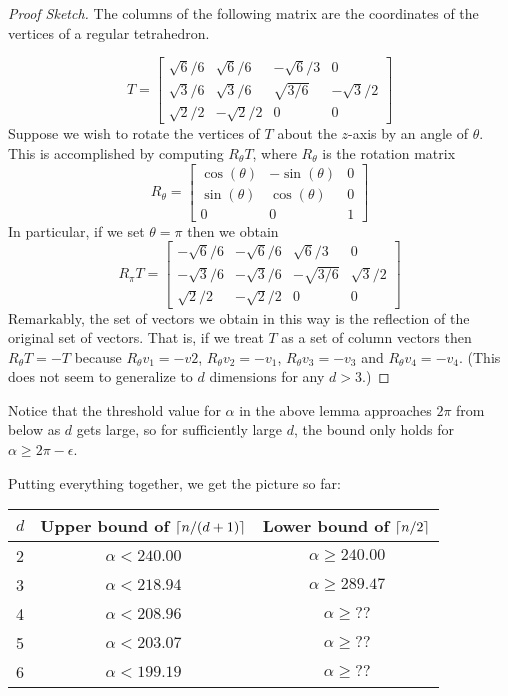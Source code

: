 \documentclass[lotsofwhite]{patmorin}
\begin{document}
\begin{proof}[Proof Sketch]
The columns of the following matrix are the coordinates of the
vertices of a regular tetrahedron.

\[T=\left[\begin{array}{cccccc}
  \sqrt{6}/6 & \sqrt{6}/6 & -\sqrt{6}/3 & 0 \\
  \sqrt{3}/6 & \sqrt{3}/6 & \sqrt{3/6} & -\sqrt{3}/2 \\
  \sqrt{2}/2 & -\sqrt{2}/2 & 0 & 0
\end{array} \right]
\]
Suppose we wish to 
rotate
the vertices of $T$ about the $z$-axis by an angle of $\theta$.
This is accomplished by computing 
$R_\theta T$, where $R_\theta$ is the rotation
matrix
\[R_\theta=\left[\begin{array}{ccccc}
   \cos(\theta)  & -\sin(\theta)  & 0 \\
   \sin(\theta)  & \cos(\theta)   & 0 \\
   0           & 0           & 1  
\end{array}\right]\]
In particular, if we set $\theta=\pi$ then we obtain
\[R_\pi T=\left[\begin{array}{cccccc}
  -\sqrt{6}/6 & -\sqrt{6}/6 & \sqrt{6}/3 & 0 \\
  -\sqrt{3}/6 & -\sqrt{3}/6 & -\sqrt{3/6} & \sqrt{3}/2 \\
  \sqrt{2}/2 & -\sqrt{2}/2 & 0 & 0
\end{array} \right]
\]
Remarkably, the set of vectors we obtain in this way is the reflection
of the original set of vectors.  That is, if we treat $T$ as a set of
column vectors then $R_\theta T=-T$ because $R_\theta v_1=-v2$,
$R_\theta v_2=-v_1$, $R_\theta v_3=-v_3$ and $R_\theta v_4=-v_4$.
(This does not seem to generalize to $d$ dimensions for any $d>3$.)
\end{proof}


Notice that the threshold value for $\alpha$ in the above lemma
approaches $2\pi$ from below as $d$ gets large, so for sufficiently
large $d$, the bound only holds for $\alpha \ge 2\pi -\epsilon$.

Putting everything together, we get the picture so far:

\begin{tabular}{l|cc}
$d$ & Upper bound of $\left\lceil n/(d+1) \right\rceil$ & Lower bound of $\left\lceil n/2 \right\rceil$ \\
\hline
2 & $\alpha < 240.00$ & $\alpha \ge 240.00$ \\
3 & $\alpha < 218.94$ & $\alpha \ge 289.47$ \\
4 & $\alpha < 208.96$ & $\alpha \ge ??$ \\
5 & $\alpha < 203.07$ & $\alpha \ge ??$ \\
6 & $\alpha < 199.19$ & $\alpha \ge ??$ \\
\end{tabular}
\end{document}
